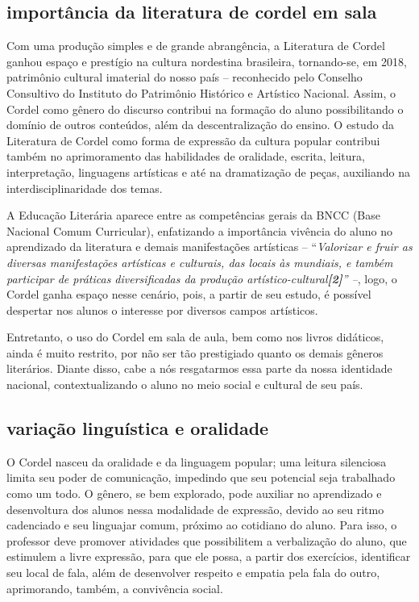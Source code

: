 \documentclass[12pt]{extarticle}
\begin{document}
\subsection{importância da literatura de cordel em sala}

Com uma produção simples e de grande abrangência, a Literatura de Cordel
ganhou espaço e prestígio na cultura nordestina brasileira, tornando-se,
em 2018, patrimônio cultural imaterial do nosso país -- reconhecido pelo
Conselho Consultivo do Instituto do Patrimônio Histórico e Artístico
Nacional. Assim, o Cordel como gênero do discurso contribui na formação
do aluno possibilitando o domínio de outros conteúdos, além da
descentralização do ensino. O estudo da Literatura de Cordel como forma
de expressão da cultura popular contribui também no aprimoramento das
habilidades de oralidade, escrita, leitura, interpretação, linguagens
artísticas e até na dramatização de peças, auxiliando na
interdisciplinaridade dos temas.

A Educação Literária aparece entre as competências gerais da BNCC (Base
Nacional Comum Curricular), enfatizando a importância vivência do aluno
no aprendizado da literatura e demais manifestações artísticas --
``\emph{Valorizar e fruir as diversas manifestações artísticas e
culturais, das locais às mundiais, e também participar de práticas
diversificadas da produção artístico-cultural\textbf{{[}2{]}}'' --},
logo, o Cordel ganha espaço nesse cenário, pois, a partir de seu estudo,
é possível despertar nos alunos o interesse por diversos campos
artísticos.

Entretanto, o uso do Cordel em sala de aula, bem como nos livros
didáticos, ainda é muito restrito, por não ser tão prestigiado quanto os
demais gêneros literários. Diante disso, cabe a nós resgatarmos essa
parte da nossa identidade nacional, contextualizando o aluno no meio
social e cultural de seu país.


\subsection{variação linguística e oralidade}

O Cordel nasceu da oralidade e da linguagem popular; uma leitura
silenciosa limita seu poder de comunicação, impedindo que seu potencial
seja trabalhado como um todo. O gênero, se bem explorado, pode auxiliar
no aprendizado e desenvoltura dos alunos nessa modalidade de expressão,
devido ao seu ritmo cadenciado e seu linguajar comum, próximo ao
cotidiano do aluno. Para isso, o professor deve promover atividades que
possibilitem a verbalização do aluno, que estimulem a livre expressão,
para que ele possa, a partir dos exercícios, identificar seu local de
fala, além de desenvolver respeito e empatia pela fala do outro,
aprimorando, também, a convivência social.
\end{document}
